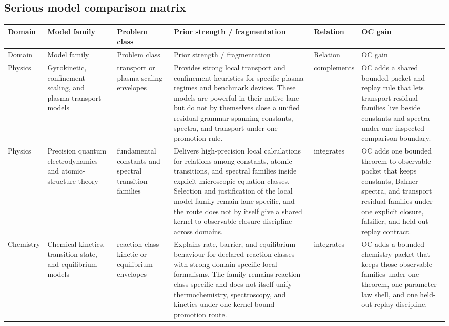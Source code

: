 \subsection{Serious model comparison matrix}
\begin{longtable}{@{}L{0.09\textwidth}L{0.14\textwidth}L{0.12\textwidth}L{0.23\textwidth}L{0.12\textwidth}L{0.22\textwidth}@{}}
\toprule
Domain & Model family & Problem class & Prior strength / fragmentation & Relation & OC gain \\
\midrule
\endfirsthead
\toprule
Domain & Model family & Problem class & Prior strength / fragmentation & Relation & OC gain \\
\midrule
\endhead
Physics & Gyrokinetic, confinement-scaling, and plasma-transport models & transport or plasma scaling envelopes & Provides strong local transport and confinement heuristics for specific plasma regimes and benchmark devices. \allowbreak These models are powerful in their native lane but do not by themselves close a unified residual grammar spanning constants, spectra, and transport under one promotion rule. & complements & OC adds a shared bounded packet and replay rule that lets transport residual families live beside constants and spectra under one inspected comparison boundary. \\
Physics & Precision quantum electrodynamics and atomic-structure theory & fundamental constants and spectral transition families & Delivers high-precision local calculations for relations among constants, atomic transitions, and spectral families inside explicit microscopic equation classes. \allowbreak Selection and justification of the local model family remain lane-specific, and the route does not by itself give a shared kernel-to-observable closure discipline across domains. & integrates & OC adds one bounded theorem-to-observable packet that keeps constants, Balmer spectra, and transport residual families under one explicit closure, falsifier, and held-out replay contract. \\
Chemistry & Chemical kinetics, transition-state, and equilibrium models & reaction-class kinetic or equilibrium envelopes & Explains rate, barrier, and equilibrium behaviour for declared reaction classes with strong domain-specific local formalisms. \allowbreak The family remains reaction-class specific and does not itself unify thermochemistry, spectroscopy, and kinetics under one kernel-bound promotion route. & integrates & OC adds a bounded chemistry packet that keeps those observable families under one theorem, one parameter-law shell, and one held-out replay discipline. \\

\end{longtable}
